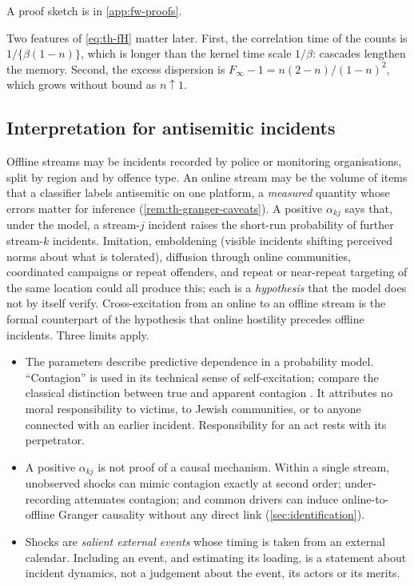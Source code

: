 A proof sketch is in \cref{app:fw-proofs}.

Two features of \eqref{eq:th-fH} matter later. First, the correlation time of the
counts is $1/\{\beta(1-n)\}$, which is longer than the kernel time scale $1/\beta$:
cascades lengthen the memory. Second, the excess dispersion is
$F_\infty-1=n(2-n)/(1-n)^2$, which grows without bound as $n\uparrow1$.

\subsection{Interpretation for antisemitic incidents}\label{sec:th-meaning}

Offline streams may be incidents recorded by police or monitoring organisations, split by
region and by offence type. An online stream may be the volume of items that a classifier
labels antisemitic on one platform, a \emph{measured} quantity whose errors matter for
inference (\cref{rem:th-granger-caveats}). A positive $\alpha_{kj}$ says that, under the
model, a stream-$j$ incident raises the short-run probability of further stream-$k$
incidents. Imitation, emboldening (visible incidents shifting perceived norms about what
is tolerated), diffusion through online communities, coordinated campaigns or repeat
offenders, and repeat or near-repeat targeting of the same location \citep{mohler2011}
could all produce this; each is a \emph{hypothesis} that the model does not by itself
verify. Cross-excitation from an online to an offline stream is the formal counterpart of
the hypothesis that online hostility precedes offline incidents. Three limits apply.
\begin{itemize}
  \item The parameters describe predictive dependence in a probability model.
    ``Contagion'' is used in its technical sense of self-excitation; compare the
    classical distinction between true and apparent contagion \citep{feller1943}.
    It attributes no moral responsibility to victims, to Jewish communities, or to anyone
    connected with an earlier incident. Responsibility for an act rests with its
    perpetrator.
  \item A positive $\alpha_{kj}$ is not proof of a causal mechanism. Within a single
    stream, unobserved shocks can mimic contagion exactly at second order; under-recording
    attenuates contagion; and common drivers can induce online-to-offline Granger
    causality without any direct link (\cref{sec:identification}).
  \item Shocks are \emph{salient external events} whose timing is taken from an external
    calendar. Including an event, and estimating its loading, is a statement about
    incident dynamics, not a judgement about the event, its actors or its merits.
\end{itemize}
